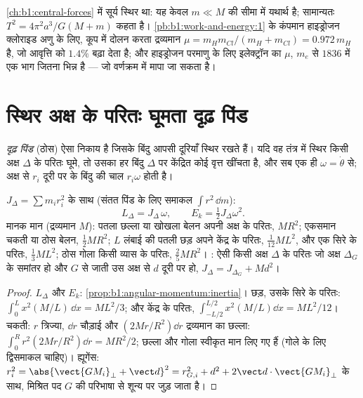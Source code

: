\begin{example}[जब केंद्र भी चलता है]\label{ex:b1:systems-of-points:reduced}
\cref{ch:b1:central-forces} में सूर्य स्थिर था: यह केवल
$m \ll M$ की सीमा में यथार्थ है; सामान्यतः  $T^2 = 4\pi^2a^3/G(M +
m)$ कहता है। \cref{pb:b1:work-and-energy:1} के कंपमान हाइड्रोजन
क्लोराइड अणु के लिए,
कूप में दोलन करता द्रव्यमान $\mu = m_Hm_{Cl}/(m_H + m_{Cl}) =
0.972\,m_H$ है, जो आवृत्ति को $1.4\%$ बढ़ा देता है; और हाइड्रोजन परमाणु
के लिए इलेक्ट्रॉन का $\mu$, $m_e$ से $1836$ में एक भाग जितना भिन्न है ---
जो वर्णक्रम में मापा जा सकता है।
\end{example}

\section{स्थिर अक्ष के परितः घूमता दृढ़ पिंड}

\begin{definition}[दृढ़ पिंड; स्थिर अक्ष के परितः घूर्णन]\label{def:b1:systems-of-points:solid}
\emph{दृढ़ पिंड} (ठोस) ऐसा निकाय है जिसके बिंदु आपसी दूरियाँ स्थिर रखते
हैं। यदि वह तंत्र में स्थिर किसी अक्ष $\Delta$ के परितः घूमे, तो उसका हर
बिंदु $\Delta$ पर केंद्रित कोई वृत्त खींचता है, और सब एक ही 
$\omega = \dot\theta$ से; अक्ष से $r_i$ दूरी पर के बिंदु की चाल
$r_i\omega$ होती है।
\end{definition}

\begin{proposition}[जड़त्व आघूर्ण; कोणीय संवेग; गतिज ऊर्जा]\label{prop:b1:systems-of-points:inertia}
\emph{} $J_\Delta = \sum m_ir_i^2$ के साथ (संतत पिंड के लिए
समाकल $\int r^2\,\dd m$):
\[
L_\Delta = J_\Delta\,\omega, \qquad E_k = \tfrac12 J_\Delta\omega^2 .
\]
मानक मान (द्रव्यमान $M$): पतला छल्ला या खोखला बेलन अपनी अक्ष के परितः,
$MR^2$; एकसमान चकती या ठोस बेलन, $\tfrac12 MR^2$; $L$ लंबाई की पतली छड़
अपने केंद्र के परितः, $\tfrac{1}{12}ML^2$, और एक सिरे के परितः,
$\tfrac13 ML^2$; ठोस गोला किसी व्यास के परितः, $\tfrac25 MR^2$।
\emph{}: ऐसी किसी अक्ष $\Delta$ के परितः जो अक्ष
$\Delta_G$ के समांतर हो और $G$ से जाती उस अक्ष से $d$ दूरी पर हो, $J_\Delta = J_{\Delta_G} + Md^2$।
\end{proposition}

\begin{proof}
$L_\Delta$ और $E_k$: \cref{prop:b1:angular-momentum:inertia}। छड़, उसके
सिरे के परितः: $\int_0^L x^2(M/L)\,\dd x = ML^2/3$; और केंद्र के परितः, $\int_{-L/2}^{L/2}
x^2(M/L)\dd x = ML^2/12$। चकती: $r$ त्रिज्या, $\dd r$ चौड़ाई और
$(2Mr/R^2)\dd r$ द्रव्यमान का छल्ला: $\int_0^R r^2(2Mr/R^2)\dd r = MR^2/2$; छल्ला और
गोला स्वीकृत मान लिए गए हैं (गोले के लिए द्विसमाकल चाहिए)। ह्यूगेंस:
$r_i^2 = \abs{\vect{GM_i}_\perp + \vect d}^2 = r_{G,i}^2 + d^2 + 2\vect d\cdot
\vect{GM_i}_\perp$ के साथ, मिश्रित पद $G$ की परिभाषा से शून्य पर जुड़ जाता है।
\end{proof}

